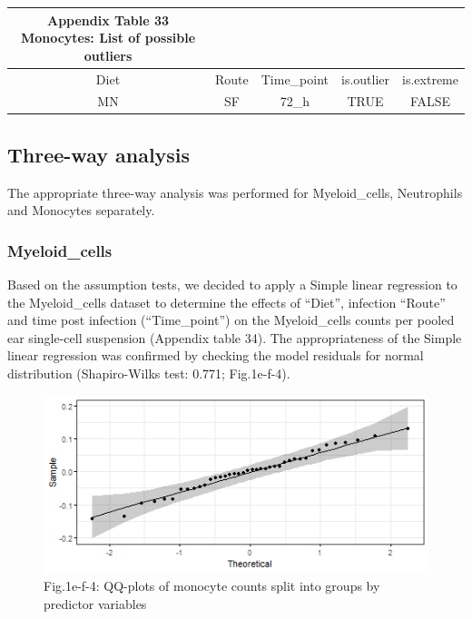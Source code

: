 \documentclass[
  12pt,
  letterpaper,
]{article}
\begin{document}
\begingroup
\fontsize{12.0pt}{14.4pt}\selectfont
\begin{longtable}{ccccc}
\caption*{
{\large \textbf{Appendix Table 33}} \\ 
{\small \textbf{Monocytes: List of possible outliers}}
} \\ 
\toprule
{Diet} & {Route} & Time\_point & {is.outlier} & {is.extreme} \\ 
\midrule\addlinespace[2.5pt]
MN & SF & 72\_h & TRUE & FALSE \\ 
\bottomrule
\end{longtable}
\endgroup

\subsection{Three-way analysis}\label{three-way-analysis-1}

The appropriate three-way analysis was performed for Myeloid\_cells, Neutrophils and Monocytes separately.

\subsubsection{Myeloid\_cells}\label{myeloid_cells-3}

Based on the assumption tests, we decided to apply a Simple linear regression to the Myeloid\_cells dataset to determine the effects of ``Diet'', infection ``Route'' and time post infection (``Time\_point'') on the Myeloid\_cells counts per pooled ear single-cell suspension (Appendix table 34). The appropriateness of the Simple linear regression was confirmed by checking the model residuals for normal distribution (Shapiro-Wilks test: 0.771; Fig.1e-f-4).

\begin{figure}[H]

{\centering \includegraphics[width=0.95\linewidth,]{Statistics_Report_files/figure-latex/qq-plot-figure-1e-f-myeloid-cell-residuals-1} 

}

\caption{Fig.1e-f-4: QQ-plots of monocyte counts split into groups by predictor variables}\label{fig:qq-plot-figure-1e-f-myeloid-cell-residuals}
\end{figure}
\end{document}

